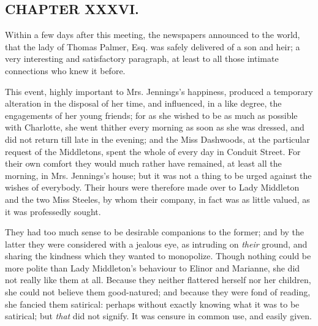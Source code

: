\subsection[chapter-xxxvi.]{\useURL[url36][][][]\from[url36]CHAPTER XXXVI.}

Within a few days after this meeting, the newspapers announced to the world, that the lady of Thomas Palmer, Esq. was safely delivered of a son and heir; a very interesting and satisfactory paragraph, at least to all those intimate connections who knew it before.

This event, highly important to Mrs. Jennings's happiness, produced a temporary alteration in the disposal of her time, and influenced, in a like degree, the engagements of her young friends; for as she wished to be as much as possible with Charlotte, she went thither every morning as soon as she was dressed, and did not return till late in the evening; and the Miss Dashwoods, at the particular request of the Middletons, spent the whole of every day in Conduit Street. For their own comfort they would much rather have remained, at least all the morning, in Mrs. Jennings's house; but it was not a thing to be urged against the wishes of everybody. Their hours were therefore made over to Lady Middleton and the two Miss Steeles, by whom their company, in fact was as little valued, as it was professedly sought.

They had too much sense to be desirable companions to the former; and by the latter they were considered with a jealous eye, as intruding on {\em their} ground, and sharing the kindness which they wanted to monopolize. Though nothing could be more polite than Lady Middleton's behaviour to Elinor and Marianne, she did not really like them at all. Because they neither flattered herself nor her children, she could not believe them good-natured; and because they were fond of reading, she fancied them satirical: perhaps without exactly knowing what it was to be satirical; but {\em that} did not signify. It was censure in common use, and easily given.

